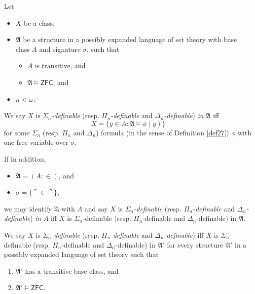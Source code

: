 \documentclass[12pt]{article}
\numberwithin{equation}{section}
\begin{document}
\begin{defi}
Let 
\begin{itemize}
    \item $X$ be a class, 
    \item $\mathfrak{A}$ be a structure in a possibly expanded language of set theory with base class $A$ and signature $\sigma$, such that 
    \begin{itemize}[label=$\circ$]
        \item $A$ is transitive, and
        \item $\mathfrak{A} \models \mathsf{ZFC}$, and
    \end{itemize}
    \item $n < \omega$.
\end{itemize}
We say $X$ is $\Sigma_n$\emph{-definable} (resp. $\Pi_n$\emph{-definable} and $\Delta_n$\emph{-definable}) \emph{in} $\mathfrak{A}$ iff $$X = \{y \in A : \mathfrak{A} \models \phi(y)\}$$ for some $\Sigma_n$ (resp. $\Pi_n$ and $\Delta_n$) formula (in the sense of Definition \ref{def27}) $\phi$ with one free variable over $\sigma$.

If in addition,
\begin{itemize}
    \item $\mathfrak{A} = (A; \in)$, and
    \item $\sigma = \{\ulcorner \in \urcorner\}$,
\end{itemize}
we may identify $\mathfrak{A}$ with $A$ and say $X$ is $\Sigma_n$\emph{-definable} (resp. $\Pi_n$\emph{-definable} and $\Delta_n$\emph{-definable}) \emph{in} $A$ iff $X$ is $\Sigma_n$-definable (resp. $\Pi_n$-definable and $\Delta_n$-definable) in $\mathfrak{A}$. 

We say $X$ is $\Sigma_n$\emph{-definable} (resp. $\Pi_n$\emph{-definable} and $\Delta_n$\emph{-definable}) iff $X$ is $\Sigma_n$-definable (resp. $\Pi_n$-definable and $\Delta_n$-definable) in $\mathfrak{A}'$ for every structure $\mathfrak{A}'$ in a possibly expanded language of set theory such that
\begin{enumerate}[label=(\alph*)]
    \item $\mathfrak{A}'$ has a transitive base class, and
    \item $\mathfrak{A}' \models \mathsf{ZFC}$.
\end{enumerate}
\end{defi}
\end{document}
